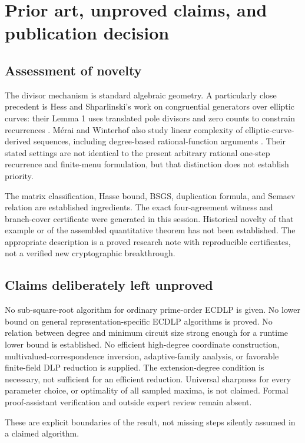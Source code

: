 \documentclass[11pt,letterpaper]{article}
\theoremstyle{definition}
\theoremstyle{remark}
\begin{document}
\section{Prior art, unproved claims, and publication decision}

\subsection{Assessment of novelty}

The divisor mechanism is standard algebraic geometry. A particularly close precedent is Hess and Shparlinski's work on congruential generators over elliptic curves: their Lemma 1 uses translated pole divisors and zero counts to constrain recurrences \cite{hess}. M\'erai and Winterhof also study linear complexity of elliptic-curve-derived sequences, including degree-based rational-function arguments \cite{merai}. Their stated settings are not identical to the present arbitrary rational one-step recurrence and finite-menu formulation, but that distinction does not establish priority.

The matrix classification, Hasse bound, BSGS, duplication formula, and Semaev relation are established ingredients. The exact four-agreement witness and branch-cover certificate were generated in this session. Historical novelty of that example or of the assembled quantitative theorem has not been established. The appropriate description is a proved research note with reproducible certificates, not a verified new cryptographic breakthrough.

\subsection{Claims deliberately left unproved}

No sub-square-root algorithm for ordinary prime-order ECDLP is given. No lower bound on general representation-specific ECDLP algorithms is proved. No relation between degree and minimum circuit size strong enough for a runtime lower bound is established. No efficient high-degree coordinate construction, multivalued-correspondence inversion, adaptive-family analysis, or favorable finite-field DLP reduction is supplied. The extension-degree condition is necessary, not sufficient for an efficient reduction. Universal sharpness for every parameter choice, or optimality of all sampled maxima, is not claimed. Formal proof-assistant verification and outside expert review remain absent.

These are explicit boundaries of the result, not missing steps silently assumed in a claimed algorithm.
\end{document}
